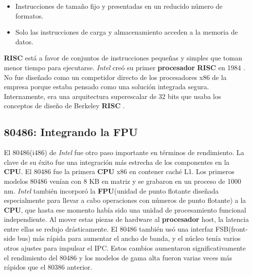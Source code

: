 \begin{itemize}
	\item Instrucciones de tamaño fijo y presentadas en un reducido número de formatos.
	\item Solo las instrucciones de carga y almacenamiento acceden a la memoria de datos.
\end{itemize}

\textbf{RISC} está a favor de conjuntos de instrucciones pequeñas y simples que toman menor tiempo para ejecutarse.
\emph{Intel} creó su primer \textbf{procesador} \textbf{RISC} en 1984 . No fue diseñado como un competidor directo de los procesadores 
x86 de la empresa porque estaba pensado como una solución integrada segura. Internamente, era una arquitectura superescalar de 32 bits que 
usaba los conceptos de diseño de Berkeley \textbf{RISC} .

\subsection{\textbf{80486}: Integrando la \textbf{FPU}}
El 80486(i486) de \emph{Intel} fue otro paso importante en términos de rendimiento. La clave de su éxito fue una integración más estrecha de los componentes 
en la \textbf{CPU}. El 80486 fue la primera \textbf{CPU} x86 en contener caché L1. Los primeros modelos 80486 venían con 8 KB en matriz y se grabaron en un proceso de 1000 nm.
\emph{Intel} también incorporó la \textbf{FPU}(unidad de punto flotante diseñada especialmente para llevar a cabo operaciones con números de punto flotante) a la \textbf{CPU}, que hasta ese 
momento había sido una unidad de procesamiento funcional independiente. Al mover estas piezas de hardware al \textbf{procesador} host, la latencia entre ellas se redujo 
drásticamente. El 80486 también usó una interfaz FSB(front-side bus) más rápida para aumentar el ancho de banda, y el núcleo 
tenía varios otros ajustes para impulsar el IPC. Estos cambios aumentaron significativamente el rendimiento del 80486 y los modelos de gama alta fueron varias 
veces más rápidos que el 80386 anterior. 

